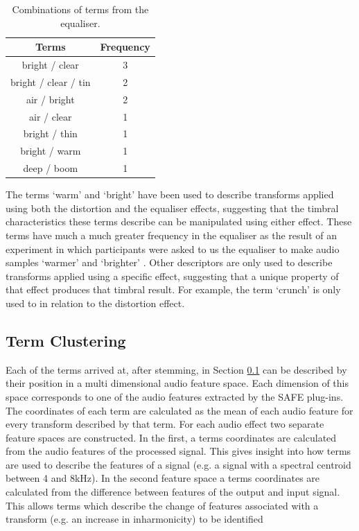 		\begin{table}[h!]
			\centering
			\begin{tabular}{|c|c|}
				\hline
				\bf{Terms} & \bf{Frequency} \tabularnewline
				\hline
				\hline
				bright / clear & 3 \tabularnewline
				\hline
				bright / clear / tin & 2 \tabularnewline
				\hline
				air / bright & 2 \tabularnewline
				\hline
				air / clear & 1 \tabularnewline
				\hline
				bright / thin & 1 \tabularnewline
				\hline
				bright / warm & 1 \tabularnewline
				\hline
				deep / boom & 1 \tabularnewline
				\hline
			\end{tabular}
			\caption{Combinations of terms from the equaliser.}
			\label{tab:EqualiserTermCombinations}
		\end{table}

		The terms `warm' and `bright' have been used to describe transforms applied using both the distortion and
		the equaliser effects, suggesting that the timbral characteristics these terms describe can be manipulated
		using either effect. These terms have much a much greater frequency in the equaliser as the result of an
		experiment in which participants were asked to us the equaliser to make audio samples `warmer' and
		`brighter' \citep{stasis2015a}. Other descriptors are only used to describe transforms applied using a
		specific effect, suggesting that a unique property of that effect produces that timbral result. For
		example, the term `crunch' is only used to in relation to the distortion effect.

	\subsection{Term Clustering}
	\label{sec:TimbreEvaluation-Analysis-TermClustering}
		Each of the terms arrived at, after stemming, in Section \ref{sec:TimbreEvaluation-Analysis-TermClustering}
		can be described by their position in a multi dimensional audio feature space. Each dimension of this space
		corresponds to one of the audio features extracted by the SAFE plug-ins. The coordinates of each term are
		calculated as the mean of each audio feature for every transform described by that term. For each audio
		effect two separate feature spaces are constructed. In the first, a terms coordinates are calculated from
		the audio features of the processed signal. This gives insight into how terms are used to describe the
		features of a signal (e.g. a signal with a spectral centroid between 4 and 8kHz). In the second feature
		space a terms coordinates are calculated from the difference between features of the output and input
		signal. This allows terms which describe the change of features associated with a transform (e.g. an
		increase in inharmonicity) to be identified

